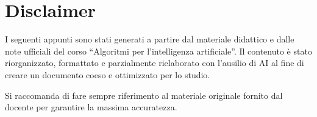 \documentclass{report}
\begin{document}
\maketitle

\tableofcontents


\section*{Disclaimer}

\vfill
\begin{nota*}{}
I seguenti appunti sono stati generati a partire dal materiale
didattico e dalle note ufficiali del corso ``Algoritmi per l'intelligenza
artificiale''.
Il contenuto è stato riorganizzato, formattato e parzialmente rielaborato con
l'ausilio di AI al fine di creare un documento coeso e ottimizzato per lo
studio.

\medskip

Si raccomanda di fare sempre riferimento al materiale originale fornito dal
docente per garantire la massima accuratezza.
\end{nota*}
\vfill









\end{document}

